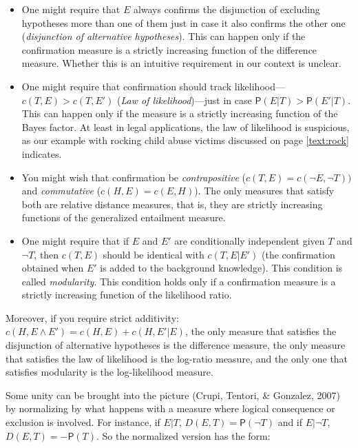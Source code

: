 \documentclass[10pt,dvipsnames,enabledeprecatedfontcommands]{scrartcl}
\newcommand{\n}{\neg}
\newcommand{\et}{\wedge}
\newcommand{\pr}[1]{\mathsf{P}(#1)}
\begin{document}
\begin{itemize}
\item
  One might require that \(E\) always confirms the disjunction of
  excluding hypotheses more than one of them just in case it also
  confirms the other one (\emph{disjunction of alternative hypotheses}).
  This can happen only if the confirmation measure is a strictly
  increasing function of the difference measure. Whether this is an
  intuitive requirement in our context is unclear.
\item
  One might require that confirmation should track
  likelihood---\(c(T,E) > c(T,E')\) (\emph{Law of likelihood})---just in
  case \(\pr{E\vert T} > \pr{E'\vert T}\). This can happen only if the
  measure is a strictly increasing function of the Bayes factor. At
  least in legal applications, the law of likelihood is suspicious, as
  our example with rocking child abuse victims discussed on page
  \ref{text:rock} indicates.
\item
  You might wish that confirmation be \emph{contrapositive}
  (\(c(T,E) = c(\n E, \n T))\) and \emph{commutative}
  (\(c(H,E) = c(E,H)\)). The only measures that satisfy both are
  relative distance measures, that is, they are strictly increasing
  functions of the generalized entailment measure.
\item
  One might require that if \(E\) and \(E'\) are conditionally
  independent given \(T\) and \(\neg T\), then \(c(T,E)\) should be
  identical with \(c(T,E\vert E')\) (the confirmation obtained when
  \(E'\) is added to the background knowledge). This condition is called
  \emph{modularity}. This condition holds only if a confirmation measure
  is a strictly increasing function of the likelihood ratio.
\end{itemize}

Moreover, if you require strict additivity:
\(c(H, E\et E') = c(H, E) + c(H, E'\vert E)\), the only measure that
satisfies the disjunction of alternative hypotheses is the difference
measure, the only measure that satisfies the law of likelihood is the
log-ratio measure, and the only one that satisfies modularity is the
log-likelihood measure.

Some unity can be brought into the picture (Crupi, Tentori, \& Gonzalez,
2007) by normalizing by what happens with a measure where logical
consequence or exclusion is involved. For instance, if \(E \vert T\),
\(D(E,T)=\pr{\n T}\) and if \(E\vert \n T\), \(D(E,T) = - \pr{T}\). So
the normalized version has the form:
\end{document}

